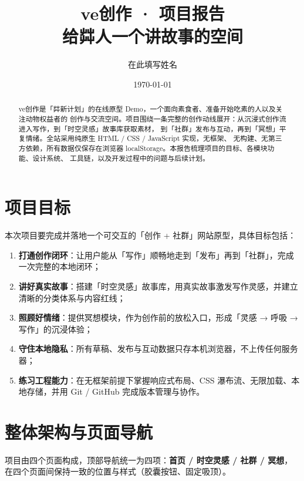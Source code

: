 \documentclass[12pt,a4paper]{ctexart}
\title{\bfseries ve创作 · 项目报告\\[2mm]
  \large 给茻人一个讲故事的空间}
\author{在此填写姓名}
\date{\today}
\begin{document}
\maketitle

\begin{abstract}
  \noindent ve创作是「茻新计划」的在线原型 Demo，一个面向素食者、准备开始吃素的人以及关注动物权益者的
  创作与交流空间。项目围绕一条完整的创作动线展开：从沉浸式创作流进入写作，到「时空灵感」故事库获取素材，
  到「社群」发布与互动，再到「冥想」平复情绪。全站采用纯原生 HTML / CSS / JavaScript 实现，无框架、
  无构建、无第三方依赖，所有数据仅保存在浏览器 localStorage。本报告梳理项目的目标、各模块功能、设计系统、
  工具链，以及开发过程中的问题与后续计划。
\end{abstract}

\tableofcontents

\section{项目目标}

本次项目要完成并落地一个可交互的「创作 + 社群」网站原型，具体目标包括：

\begin{enumerate}
  \item \textbf{打通创作闭环}：让用户能从「写作」顺畅地走到「发布」再到「社群」，完成一次完整的本地闭环；
  \item \textbf{讲好真实故事}：搭建「时空灵感」故事库，用真实故事激发写作灵感，并建立清晰的分类体系与内容红线；
  \item \textbf{照顾好情绪}：提供冥想模块，作为创作前的放松入口，形成「灵感 → 呼吸 → 写作」的沉浸体验；
  \item \textbf{守住本地隐私}：所有草稿、发布与互动数据只存本机浏览器，不上传任何服务器；
  \item \textbf{练习工程能力}：在无框架前提下掌握响应式布局、CSS 瀑布流、无限加载、本地存储，并用 Git / GitHub 完成版本管理与协作。
\end{enumerate}

\section{整体架构与页面导航}

项目由四个页面构成，顶部导航统一为四项：\textbf{首页 / 时空灵感 / 社群 / 冥想}，
在四个页面间保持一致的位置与样式（胶囊按钮、固定吸顶）。
\end{document}

